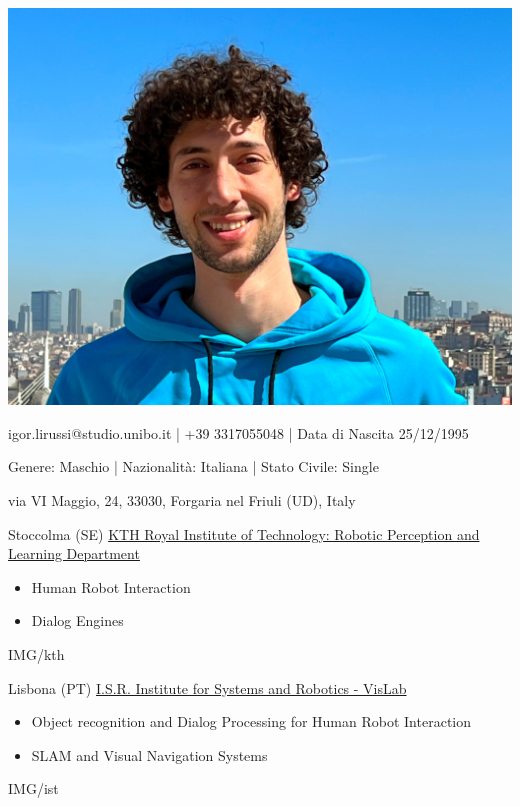 \documentclass[paper=a4,fontsize=11pt]{temp} %
\begin{document}
\begin{minipage}{.2\linewidth}
   \includegraphics[width=1\textwidth]{photo}
\end{minipage}      
\begin{minipage}{0.7\linewidth}
   \sepspace
   \noindent
   \hfill igor.lirussi@studio.unibo.it | +39 3317055048 | Data di Nascita 25/12/1995
   
   \hfill Genere: Maschio | Nazionalità: Italiana | Stato Civile: Single
   
   \hfill via VI Maggio, 24, 33030, Forgaria nel Friuli (UD), Italy
 
\end{minipage}


\noindent

{Stoccolma (SE) \href{https://www.kth.se/is/rpl}{KTH Royal Institute of Technology: Robotic Perception and Learning Department}}
{
 \begin{itemize}
    \item Human Robot Interaction
    \item Dialog Engines
 \end{itemize}
} {IMG/kth}

\sepspace

{Lisbona (PT) \href{https://welcome.isr.tecnico.ulisboa.pt/}{ I.S.R. Institute for Systems and Robotics - VisLab}}
{
 \begin{itemize}
    \item Object recognition and Dialog Processing for Human Robot Interaction
    \item SLAM and Visual Navigation Systems
 \end{itemize}
} {IMG/ist}
\end{document}
